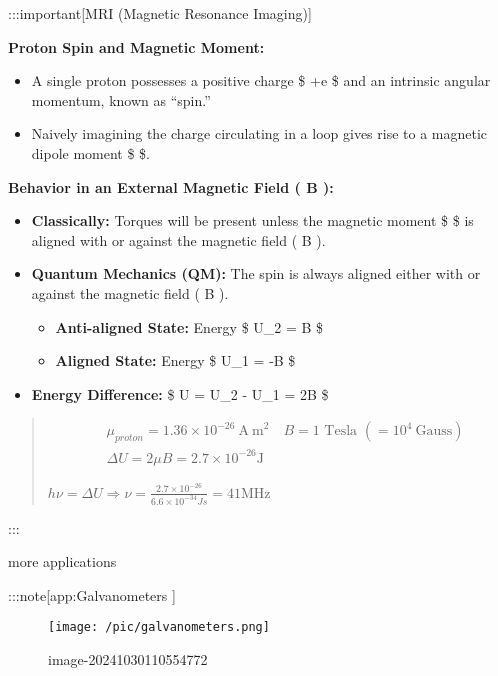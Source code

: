 \documentclass[
]{article}
\providecommand{\tightlist}{%
  \setlength{\itemsep}{0pt}\setlength{\parskip}{0pt}}
\begin{document}
:::important{[}MRI (Magnetic Resonance Imaging){]}

\textbf{Proton Spin and Magnetic Moment:}

\begin{itemize}
\tightlist
\item
  A single proton possesses a positive charge \$ +\textbar e\textbar{}
  \$ and an intrinsic angular momentum, known as ``spin.''
\item
  Naively imagining the charge circulating in a loop gives rise to a
  magnetic dipole moment \$ \mu \$.
\end{itemize}

\textbf{Behavior in an External Magnetic Field ( B ):}

\begin{itemize}
\item
  \textbf{Classically:} Torques will be present unless the magnetic
  moment \$\vec{\mu} \$ is aligned with or against the magnetic field (
  B ).
\item
  \textbf{Quantum Mechanics (QM):} The spin is always aligned either
  with or against the magnetic field ( B ).

  \begin{itemize}
  \tightlist
  \item
    \textbf{Anti-aligned State:} Energy \$ U\_2 = \mu B \$
  \item
    \textbf{Aligned State:} Energy \$ U\_1 = -\mu B \$
  \end{itemize}
\item
  \textbf{Energy Difference:} \$ \Delta U = U\_2 - U\_1 = 2\mu B \$
\end{itemize}

\begin{quote}
\[
\begin{aligned}&\mu_{proton}=1.36\times10^{-26}\mathrm{~A~m}^2\quad B=1\text{ Tesla }(=10^4\mathrm{~Gauss})\\&\Delta U=2\mu B=2.7\times10^{-26}\mathrm{J}\end{aligned}
\]

\(h\nu =\Delta U\Rightarrow \nu=\frac{2.7\times 10^{-26}}{6.6\times 10^{-34}Js}=41\mathrm{MHz}\)
\end{quote}

:::

more applications

:::note{[}app:Galvanometers {]}

\begin{figure}
\centering
\texttt{[image: /pic/galvanometers.png]}
\caption{image-20241030110554772}
\end{figure}
\end{document}
